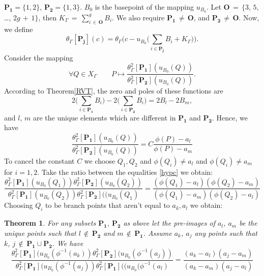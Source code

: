 \documentclass[]{amsart}
\numberwithin{equation}{section}
\newtheorem{theorem}{Theorem}[section]
\begin{document}
$\mathbf{P_1}=\{1,2\}$, $\mathbf{P_2}=\{1,3\}.$  $B_0$ is the basepoint of the mapping $u_{B_0}$.
Let $\mathbf{O}\,{=}\,\{3$, $5$, \ldots, $2g\,{+}\,1\}$, then 
$K_{\Gamma}\,{=}\, \sum_{i \,{\in}\,\mathbf{O}}^g B_{i}$. 
We  also require $\mathbf{P_1}\,{\neq}\,\mathbf{O}$, and $\mathbf{P_2}\,{\neq}\,\mathbf{O}$. 
Now, we define 
$$\theta_{\Gamma}[\mathbf{P_j}](c) = \theta_\Gamma 
\Big(c-u_{B_0}\Big(\textstyle\sum_{i\in \mathbf{P_j}} B_i+K_{\Gamma}\Big) \Big).$$
 Consider the mapping 
\begin{equation} 
\forall Q \in X_{\Gamma} \qquad
P\mapsto \frac{\theta^2_{\Gamma}\left[\mathbf{P_1}\right](u_{B_0}(Q))}
{\theta^2_{\Gamma}\left[\mathbf{P_2}\right](u_{B_0}(Q))}.
\end{equation} 
According to Theorem\;\ref{RVT}, the zero and poles of these functions are
$$
2 \Big(\sum_{i\in \mathbf{P_1}} B_i\Big)
- 2 \Big(\sum_{i\in \mathbf{P_2}} B_i \Big)= 2B_l - 2B_m,
$$
and $l$, $m$ are the unique elements which are different in $\mathbf{P_1}$ and $\mathbf{P_2}$. 
Hence, we have 
$$\frac{\theta^2_{\Gamma}\left[\mathbf{P_1}\right](u_{B_0}(Q))}
{\theta^2_{\Gamma}\left[\mathbf{P_2}\right](u_{B_0}(Q))} = C\frac{\phi(P) - a_l}{\phi(P) - a_m}$$\label{hypc}
To cancel the constant $C$ we choose $Q_1,Q_2$ and $\phi(Q_i)\neq a_l$ and $\phi(Q_i)\neq a_m$ for $i=1,2.$ Take the ratio between the equalities \ref{hypc} we obtain: 
\begin{equation}
\frac{\theta^2_{\Gamma}\left[\mathbf{P_1}\right](u_{B_0}(Q_1))\theta^2_{\Gamma}\left[\mathbf{P_2}\right](u_{B_0}(Q_2))}{\theta^2_{\Gamma}\left[\mathbf{P_1}\right](u_{B_0}(Q_2))\theta^2_{\Gamma}\left[\mathbf{P_2}\right]((u_{B_0}(Q_1)}
=\frac{(\phi(Q_1) - a_l)(\phi(Q_2) - a_m)}{(\phi(Q_1) - a_m)(\phi(Q_2)-a_l)}
\end{equation}
Choosing $Q_i$ to be branch points that aren't equal to $a_k, a_l$ we obtain: 
\begin{theorem} 
For any subsets $\mathbf{P_1}$, $\mathbf{P_2}$ as above let the pre-images of $a_l$, $a_m$ be the unique points such that $l\,{\not\in}\, \mathbf{P_2}$ and $m\,{\not\in}\, \mathbf{P_1}$. 
Assume $a_k$, $a_j$ any points such that $k$, $j\,{\not\in}\, \mathbf{P_1}\cup\mathbf{P_2}$. We have 
\begin{equation}
\frac{\theta^2_{\Gamma}\left[\mathbf{P_1}\right](u_{B_0}(\phi^{-1}(a_k))\theta^2_{\Gamma}\left[\mathbf{P_2}\right](u_{B_0}(\phi^{-1}(a_j))}{\theta^2_{\Gamma}\left[\mathbf{P_1}\right](u_{B_0}(\phi^{-1}(a_j))\theta^2_{\Gamma}\left[\mathbf{P_1}\right]((u_{B_0}(\phi^{-1}(a_l)}
=\frac{(a_k - a_l)(a_j - a_m)}{(a_k - a_m)(a_j-a_l)}\end{equation}
\end{theorem} 
\end{document}
